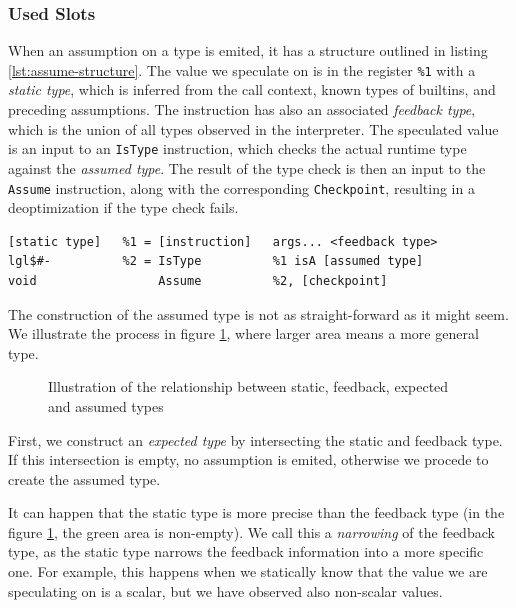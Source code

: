 \subsubsection*{Used Slots}

When an assumption on a type is emited, it has a structure outlined in listing \ref{lst:assume-structure}. The value we speculate on is in the register \texttt{\%1} with a \textit{static type}, which is inferred from the call context, known types of builtins, and preceding assumptions. The instruction has also an associated \textit{feedback type}, which is the union of all types observed in the interpreter. The speculated value is an input to an \texttt{IsType} instruction, which checks the actual runtime type against the \textit{assumed type}. The result of the type check is then an input to the \texttt{Assume} instruction, along with the corresponding \texttt{Checkpoint}, resulting in a deoptimization if the type check fails.

\begin{listing}[H]
	\centering
	\begin{verbatim}
[static type]   %1 = [instruction]   args... <feedback type>
lgl$#-          %2 = IsType          %1 isA [assumed type]
void                 Assume          %2, [checkpoint]
  \end{verbatim}
	\caption{PIR code structure of type assumption}\label{lst:assume-structure}
\end{listing}

The construction of the assumed type is not as straight-forward as it might seem. We illustrate the process in figure \ref{fig:types-venn}, where larger area means a more general type.

\begin{figure}
	\centering
	\caption{Illustration of the relationship between static, feedback, expected and assumed types}\label{fig:types-venn}
\end{figure}

First, we construct an \textit{expected type} by intersecting the static and feedback type. If this intersection is empty, no assumption is emited, otherwise we procede to create the assumed type.

It can happen that the static type is more precise than the feedback type (in the figure \ref{fig:types-venn}, the green area is non-empty). We call this a \textit{narrowing} of the feedback type, as the static type narrows the feedback information into a more specific one. For example, this happens when we statically know that the value we are speculating on is a scalar, but we have observed also non-scalar values.

